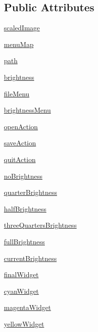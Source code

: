 \subsection*{Public Attributes}
\begin{DoxyCompactItemize}
\item 
\hyperlink{classseparations_1_1Viewer_abb4093513c0d28e5c86ab5dc9d8e642b}{scaled\+Image}
\item 
\hyperlink{classseparations_1_1Viewer_a71d4f02045f0c8aa95b71430d3addb78}{menu\+Map}
\item 
\hyperlink{classseparations_1_1Viewer_a27e9f3262b41d8c93016e6ef905a3dcf}{path}
\item 
\hyperlink{classseparations_1_1Viewer_a272e713f0e032562ea8b1a5039e6abac}{brightness}
\item 
\hyperlink{classseparations_1_1Viewer_a297639ea47bc2231dce232867b9ccbb8}{file\+Menu}
\item 
\hyperlink{classseparations_1_1Viewer_a1ee4cf2a496921b3813badea1227d7bf}{brightness\+Menu}
\item 
\hyperlink{classseparations_1_1Viewer_aead9246c8a40c59dbfa228fb47c7da45}{open\+Action}
\item 
\hyperlink{classseparations_1_1Viewer_a03f5d7395af48ef5d795e49d793fb922}{save\+Action}
\item 
\hyperlink{classseparations_1_1Viewer_a152437defe803d479df092c886507689}{quit\+Action}
\item 
\hyperlink{classseparations_1_1Viewer_a985bbf076f69dc424244f1c0e4456ecc}{no\+Brightness}
\item 
\hyperlink{classseparations_1_1Viewer_ad4fce9fd1cbb31f1a680b43c7577db60}{quarter\+Brightness}
\item 
\hyperlink{classseparations_1_1Viewer_abdd3a4da226b01175e5e4dba68a49b98}{half\+Brightness}
\item 
\hyperlink{classseparations_1_1Viewer_a3672a73249ba93bd9188a3cb76bd964f}{three\+Quarters\+Brightness}
\item 
\hyperlink{classseparations_1_1Viewer_a728b85f5ab6b27f39b6498fb25e4844a}{full\+Brightness}
\item 
\hyperlink{classseparations_1_1Viewer_a5687005d61cf38c2ebbda1ae01ee2063}{current\+Brightness}
\item 
\hyperlink{classseparations_1_1Viewer_a797d72a066b8045d0f5ab3dbc8145706}{final\+Widget}
\item 
\hyperlink{classseparations_1_1Viewer_a4516e623e6e4a7669d2cbdc3c607b56c}{cyan\+Widget}
\item 
\hyperlink{classseparations_1_1Viewer_a67accb54f41acf28d432d5a4cad5ef7d}{magenta\+Widget}
\item 
\hyperlink{classseparations_1_1Viewer_a5714b4ad9ff54d49f7abc7f511735e61}{yellow\+Widget}
\end{DoxyCompactItemize}
